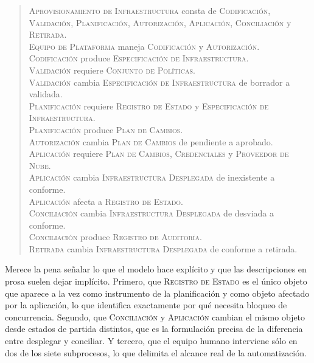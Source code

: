 \documentclass[11pt,letterpaper]{article}
\begin{document}
\begin{quote}\small
\textsc{Aprovisionamiento de Infraestructura} consta de
\textsc{Codificación}, \textsc{Validación}, \textsc{Planificación},
\textsc{Autorización}, \textsc{Aplicación}, \textsc{Conciliación} y
\textsc{Retirada}.\\
\textsc{Equipo de Plataforma} maneja \textsc{Codificación} y
\textsc{Autorización}.\\
\textsc{Codificación} produce \textsc{Especificación de Infraestructura}.\\
\textsc{Validación} requiere \textsc{Conjunto de Políticas}.\\
\textsc{Validación} cambia \textsc{Especificación de Infraestructura} de
borrador a validada.\\
\textsc{Planificación} requiere \textsc{Registro de Estado} y
\textsc{Especificación de Infraestructura}.\\
\textsc{Planificación} produce \textsc{Plan de Cambios}.\\
\textsc{Autorización} cambia \textsc{Plan de Cambios} de pendiente a
aprobado.\\
\textsc{Aplicación} requiere \textsc{Plan de Cambios}, \textsc{Credenciales}
y \textsc{Proveedor de Nube}.\\
\textsc{Aplicación} cambia \textsc{Infraestructura Desplegada} de inexistente
a conforme.\\
\textsc{Aplicación} afecta a \textsc{Registro de Estado}.\\
\textsc{Conciliación} cambia \textsc{Infraestructura Desplegada} de desviada
a conforme.\\
\textsc{Conciliación} produce \textsc{Registro de Auditoría}.\\
\textsc{Retirada} cambia \textsc{Infraestructura Desplegada} de conforme a
retirada.
\end{quote}

Merece la pena señalar lo que el modelo hace explícito y que las descripciones
en prosa suelen dejar implícito. Primero, que \textsc{Registro de Estado} es
el único objeto que aparece a la vez como instrumento de la planificación y
como objeto afectado por la aplicación, lo que identifica exactamente por qué
necesita bloqueo de concurrencia. Segundo, que \textsc{Conciliación} y
\textsc{Aplicación} cambian el mismo objeto desde estados de partida
distintos, que es la formulación precisa de la diferencia entre desplegar y
conciliar. Y tercero, que el equipo humano interviene sólo en dos de los siete
subprocesos, lo que delimita el alcance real de la automatización.
\end{document}
